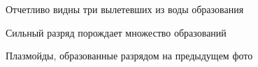 \documentclass[a4paper]{article}
\begin{document}
\begin{figure}[h!]
    \caption{Отчетливо видны три вылетевших из воды образования}
\end{figure}
\begin{figure}[h!]
    \caption{Сильный разряд порождает множество образований}
\end{figure}
\begin{figure}[h!]
    \caption{Плазмойды, образованные разрядом на предыдущем фото}
\end{figure}
\end{document}
